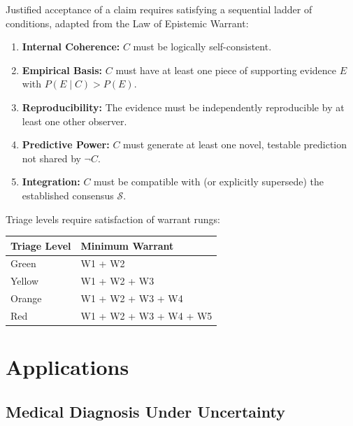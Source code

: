 \documentclass[12pt, a4paper]{article}
\theoremstyle{plain}
\theoremstyle{definition}
\begin{document}
\begin{axiom}\label{ax:warrant}
  Justified acceptance of a claim requires satisfying a sequential
  ladder of conditions, adapted from the Law of Epistemic Warrant:
  \begin{enumerate}[label=\textbf{W\arabic*:}]
    \item \textbf{Internal Coherence:} $C$ must be logically
      self-consistent.
    \item \textbf{Empirical Basis:} $C$ must have at least one
      piece of supporting evidence $E$ with $P(E \mid C) > P(E)$.
    \item \textbf{Reproducibility:} The evidence must be
      independently reproducible by at least one other observer.
    \item \textbf{Predictive Power:} $C$ must generate at least
      one novel, testable prediction not shared by $\neg C$.
    \item \textbf{Integration:} $C$ must be compatible with (or
      explicitly supersede) the established consensus $\mathcal{S}$.
  \end{enumerate}
\end{axiom}

\begin{proposition}\label{prop:correspondence}
  Triage levels require satisfaction of warrant rungs:
  \begin{center}
  \begin{tabular}{ll}
    \toprule
    \textbf{Triage Level} & \textbf{Minimum Warrant} \\
    \midrule
    Green & W1 + W2 \\
    Yellow & W1 + W2 + W3 \\
    Orange & W1 + W2 + W3 + W4 \\
    Red & W1 + W2 + W3 + W4 + W5 \\
    \bottomrule
  \end{tabular}
  \end{center}
\end{proposition}

\section{Applications}\label{sec:applications}

\subsection{Medical Diagnosis Under Uncertainty}
\end{document}
